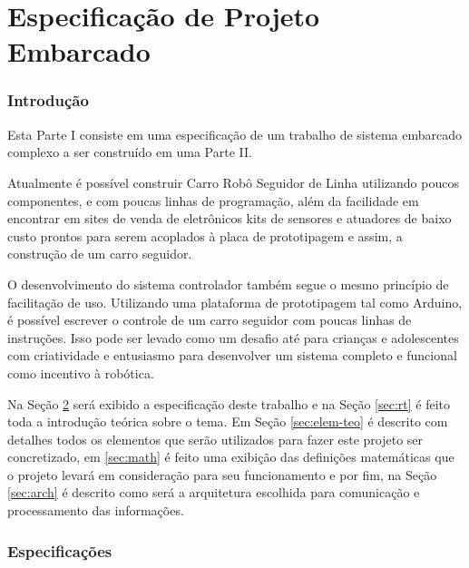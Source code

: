 \documentclass[portugues, brazil, a4paper,12pt]{article}
\begin{document}

\part{Especificação de Projeto Embarcado}


\section{Introdução}
	Esta Parte I consiste em uma especificação de um trabalho de sistema embarcado complexo a ser construído em uma Parte II.

	Atualmente é possível construir Carro Robô Seguidor de Linha utilizando poucos componentes, e com poucas linhas de programação, além da facilidade em encontrar em sites de venda de eletrônicos kits de sensores e atuadores de baixo custo prontos para serem acoplados à placa de prototipagem e assim, a construção de um carro seguidor.

	O desenvolvimento do sistema controlador também segue o mesmo princípio de facilitação de uso. Utilizando uma plataforma de prototipagem tal como Arduino, é possível escrever o controle de um carro seguidor com poucas linhas de instruções. Isso pode ser levado como um desafio até para crianças e adolescentes com criatividade e entusiasmo para desenvolver um sistema completo e funcional como incentivo à robótica.

	Na Seção \ref{sec:especificacao} será exibido a especificação deste trabalho e na Seção \ref{sec:rt} é feito toda a introdução teórica sobre o tema. Em Seção \ref{sec:elem-teo} é descrito com detalhes todos os elementos que serão utilizados para fazer este projeto ser concretizado, em \ref{sec:math} é feito uma exibição das definições matemáticas que o projeto levará em consideração para seu funcionamento e por fim, na Seção \ref{sec:arch} é descrito como será a arquitetura escolhida para comunicação e processamento das informações.


\section{Especificações} \label{sec:especificacao}
\end{document}
